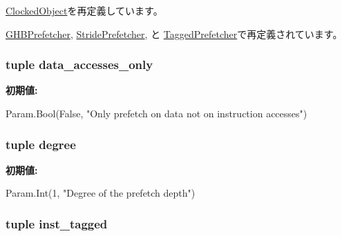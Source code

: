 \hyperlink{classClockedObject_1_1ClockedObject_a17da7064bc5c518791f0c891eff05fda}{ClockedObject}を再定義しています。

\hyperlink{classPrefetcher_1_1GHBPrefetcher_a17da7064bc5c518791f0c891eff05fda}{GHBPrefetcher}, \hyperlink{classPrefetcher_1_1StridePrefetcher_a17da7064bc5c518791f0c891eff05fda}{StridePrefetcher}, と \hyperlink{classPrefetcher_1_1TaggedPrefetcher_a17da7064bc5c518791f0c891eff05fda}{TaggedPrefetcher}で再定義されています。\hypertarget{classPrefetcher_1_1BasePrefetcher_a40e617b19a135a4d354e77f775d57017}{
\subsubsection[{data\_\-accesses\_\-only}]{\setlength{\rightskip}{0pt plus 5cm}tuple data\_\-accesses\_\-only}}
\label{classPrefetcher_1_1BasePrefetcher_a40e617b19a135a4d354e77f775d57017}
{\bfseries 初期値:}
\begin{DoxyCode}
Param.Bool(False,
         "Only prefetch on data not on instruction accesses")
\end{DoxyCode}
\hypertarget{classPrefetcher_1_1BasePrefetcher_a905c31e5b655fd35cb079a4afb20b7a8}{
\subsubsection[{degree}]{\setlength{\rightskip}{0pt plus 5cm}tuple degree}}
\label{classPrefetcher_1_1BasePrefetcher_a905c31e5b655fd35cb079a4afb20b7a8}
{\bfseries 初期値:}
\begin{DoxyCode}
Param.Int(1,
         "Degree of the prefetch depth")
\end{DoxyCode}
\hypertarget{classPrefetcher_1_1BasePrefetcher_a11272c9ffaf66f5ab8370ae66fe440bf}{
\subsubsection[{inst\_\-tagged}]{\setlength{\rightskip}{0pt plus 5cm}tuple inst\_\-tagged}}
